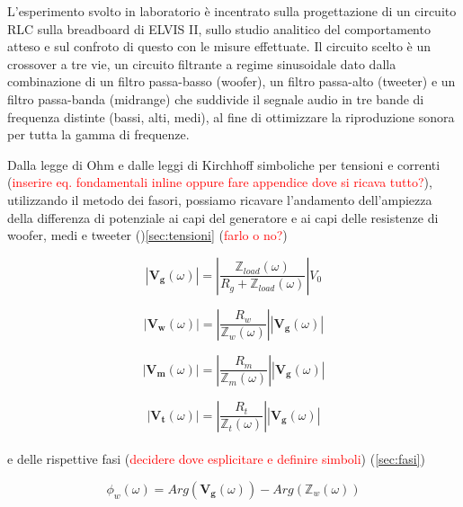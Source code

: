 \documentclass[12pt,italian]{article}
\newcommand{\err}[1]{\textcolor{red}{#1}}
\begin{document}
L'esperimento svolto in laboratorio è incentrato sulla progettazione di un
circuito RLC sulla breadboard di ELVIS II, sullo studio analitico del
comportamento atteso e sul confroto di questo con le misure effettuate. Il
circuito scelto è un crossover a tre vie, un circuito filtrante a regime
sinusoidale dato dalla combinazione di un filtro passa-basso (woofer), un
filtro passa-alto (tweeter) e un filtro passa-banda (midrange) che suddivide il
segnale audio in tre bande di frequenza distinte (bassi, alti, medi), al fine
di ottimizzare la riproduzione sonora per tutta la gamma di frequenze.

Dalla legge di Ohm e dalle leggi di Kirchhoff simboliche per tensioni e
correnti (\err{inserire eq. fondamentali inline oppure fare appendice dove si
	ricava tutto?}), utilizzando il metodo dei fasori, possiamo ricavare
l'andamento dell'ampiezza della differenza di potenziale ai capi del generatore
e ai capi delle resistenze di woofer, medi e tweeter ()\ref{sec:tensioni}
(\err{farlo o no?})

\begin{equation}
	\left| \mathbf{V_{g}}(\omega) \right| = \left| \frac{\mathbb{Z}_{load}(\omega)}
	{R_{g}+\mathbb{Z}_{load}(\omega)}\right| V_{0}
	\label{eq:Vg}
\end{equation}

\begin{equation}
	\left| \mathbf{V_{w}}(\omega) \right| = \left| \frac{R_{w}}
	{\mathbb{Z}_{w}(\omega)}\right|\left| \mathbf{V_{g}}(\omega) \right|
	\label{eq:Vw}
\end{equation}

\begin{equation}
	\left| \mathbf{V_{m}}(\omega) \right| = \left| \frac{R_{m}}
	{\mathbb{Z}_{m}(\omega)}\right|\left| \mathbf{V_{g}}(\omega) \right|
	\label{eq:Vm}
\end{equation}

\begin{equation}
	\left| \mathbf{V_{t}}(\omega) \right| = \left| \frac{R_{t}}
	{\mathbb{Z}_{t}(\omega)}\right|\left| \mathbf{V_{g}}(\omega) \right|
	\label{eq:Vt}
\end{equation}
\\
e delle rispettive fasi (\err{decidere dove esplicitare e definire simboli}) (\ref{sec:fasi})

\begin{equation}
	\phi_{w}(\omega) = Arg(\mathbf{V_{g}}(\omega)) - Arg(\mathbb{Z}_{w}(\omega))
\end{equation}
\end{document}
